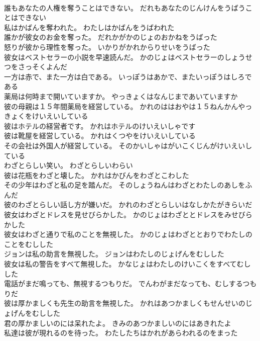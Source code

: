 \documentclass[8pt]{extreport}
\begin{document}
\begin{CJK}{UTF8}{min}
\\	誰もあなたの人権を奪うことはできない。	だれもあなたのじんけんをうばうことはできない 
\\	私はかばんを奪われた。	わたしはかばんをうばわれた 
\\	誰かが彼女のお金を奪った。	だれかがかのじょのおかねをうばった 
\\	怒りが彼から理性を奪った。	いかりがかれからりせいをうばった 
\\	彼女はベストセラーの小説を早速読んだ。	かのじょはベストセラーのしょうせつをさっそくよんだ 
\\	一方は赤で、また一方は白である。	いっぽうはあかで、またいっぽうはしろである 
\\	薬局は何時まで開いていますか。	やっきょくはなんじまであいていますか 
\\	彼の母親は１５年間薬局を経営している。	かれのははおやは１５ねんかんやっきょくをけいえいしている 
\\	彼はホテルの経営者です。	かれはホテルのけいえいしゃです 
\\	彼は靴屋を経営している。	かれはくつやをけいえいしている 
\\	その会社は外国人が経営している。	そのかいしゃはがいこくじんがけいえいしている 
\\	わざとらしい笑い。	わざとらしいわらい 
\\	彼は花瓶をわざと壊した。	かれはかびんをわざとこわした 
\\	その少年はわざと私の足を踏んだ。	そのしょうねんはわざとわたしのあしをふんだ 
\\	彼のわざとらしい話し方が嫌いだ。	かれのわざとらしいはなしかたがきらいだ 
\\	彼女はわざとドレスを見せびらかした。	かのじょはわざととドレスをみせびらかした 
\\	彼女はわざと通りで私のことを無視した。	かのじょはわざととおりでわたしのことをむしした 
\\	ジョンは私の助言を無視した。	ジョンはわたしのじょげんをむしした 
\\	彼女は私の警告をすべて無視した。	かなじょはわたしのけいこくをすべてむしした 
\\	電話がまだ鳴っても、無視するつもりだ。	でんわがまだなっても、むしするつもりだ 
\\	彼は厚かましくも先生の助言を無視した。	かれはあつかましくもせんせいのじょげんをむしした 
\\	君の厚かましいのには呆れたよ。	きみのあつかましいのにはあきれたよ 
\\	私達は彼が現れるのを待った。	わたしたちはかれがあらわれるのをまった 

\end{CJK}
\end{document}
